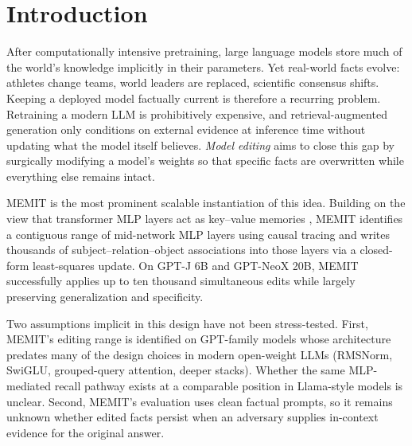 \section{Introduction}
After computationally intensive pretraining, large language models store much of the world's knowledge implicitly in their parameters. Yet real-world facts evolve: athletes change teams, world leaders are replaced, scientific consensus shifts. Keeping a deployed model factually current is therefore a recurring problem. Retraining a modern LLM is prohibitively expensive, and retrieval-augmented generation only conditions on external evidence at inference time without updating what the model itself believes. \emph{Model editing} aims to close this gap by surgically modifying a model's weights so that specific facts are overwritten while everything else remains intact.

MEMIT \cite{meng2023masseditingmemorytransformer} is the most prominent scalable instantiation of this idea. Building on the view that transformer MLP layers act as key--value memories \cite{geva2021transformer}, MEMIT identifies a contiguous range of mid-network MLP layers using causal tracing and writes thousands of subject--relation--object associations into those layers via a closed-form least-squares update. On GPT-J 6B and GPT-NeoX 20B, MEMIT successfully applies up to ten thousand simultaneous edits while largely preserving generalization and specificity.

Two assumptions implicit in this design have not been stress-tested. First, MEMIT's editing range is identified on GPT-family models whose architecture predates many of the design choices in modern open-weight LLMs (RMSNorm, SwiGLU, grouped-query attention, deeper stacks). Whether the same MLP-mediated recall pathway exists at a comparable position in Llama-style models is unclear. Second, MEMIT's evaluation uses clean factual prompts, so it remains unknown whether edited facts persist when an adversary supplies in-context evidence for the original answer.

